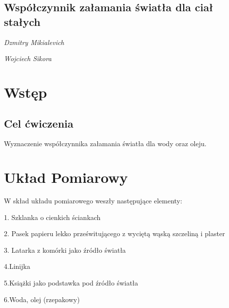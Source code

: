 \documentclass[]{article}
\begin{document}
\begin{figure}[tp!]
	\center{\texttt{[image: F]}}
\end{figure}

\begin{center}
	\section*{Współczynnik załamania światła dla ciał stałych }
	\emph{Dzmitry Mikialevich}
\end{center}
\begin{center}
	\emph{Wojciech Sikora}
\end{center}
\tableofcontents
\newpage

\section{Wstęp}

\subsection{Cel ćwiczenia}
Wyznaczenie współczynnika załamania światła dla wody oraz oleju.

    


    
\section{Układ Pomiarowy}
W skład układu pomiarowego weszły następujące elementy:
\newline

1. Szklanka o cienkich ściankach


2. Pasek papieru lekko prześwitującego z wyciętą wąską szczeliną i plaster


3. Latarka z komórki jako źródło światła

4.Linijka

5.Książki jako podstawka pod źródło światła

6.Woda, olej (rzepakowy)
\end{document}
